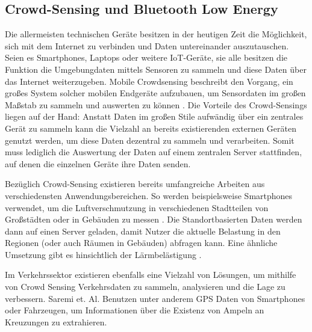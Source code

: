 \documentclass[conference]{IEEEtran}
\begin{document}
\subsection{Crowd-Sensing und Bluetooth Low Energy}
Die allermeisten technischen Geräte besitzen in der heutigen Zeit die Möglichkeit, sich mit dem Internet zu verbinden und Daten untereinander auszutauschen.
Seien es Smartphones, Laptops oder weitere IoT-Geräte, sie alle besitzen die Funktion die Umgebungdaten mittels Sensoren zu sammeln und diese Daten über das Internet weiterzugeben.
Mobile Crowdsensing beschreibt den Vorgang, ein großes System solcher mobilen Endgeräte aufzubauen, um Sensordaten im großen Maßstab zu sammeln und auswerten zu können \cite{MCS}.
Die Vorteile des Crowd-Sensings liegen auf der Hand: Anstatt Daten im großen Stile aufwändig über ein zentrales Gerät zu sammeln kann die Vielzahl an bereits existierenden externen Geräten genutzt werden, um diese Daten dezentral zu sammeln und verarbeiten.
Somit muss lediglich die Auswertung der Daten auf einem zentralen Server stattfinden, auf denen die einzelnen Geräte ihre Daten senden. 

Bezüglich Crowd-Sensing existieren  bereits umfangreiche Arbeiten aus verschiedensten Anwendungsbereichen. 
So werden beispielsweise Smartphones verwendet, um die Luftverschmutzung in verschiedenen Stadtteilen von Großstädten oder in Gebäuden zu messen \cite{AirQuality}. 
Die Standortbasierten Daten werden dann auf einen Server geladen, damit Nutzer die aktuelle Belastung in den Regionen (oder auch Räumen in Gebäuden) abfragen kann. Eine ähnliche Umsetzung gibt es hinsichtlich der Lärmbelästigung \cite{NoiseSense}. 

Im Verkehrssektor existieren ebenfalls eine Vielzahl von Lösungen, um mithilfe von Crowd Sensing Verkehrsdaten zu sammeln, analysieren und die Lage zu verbessern. 
Saremi et. Al. \cite{TrafficRegulators} Benutzen unter anderem GPS Daten von Smartphones oder Fahrzeugen, um Informationen über die Existenz von Ampeln an Kreuzungen zu extrahieren. 
\end{document}
